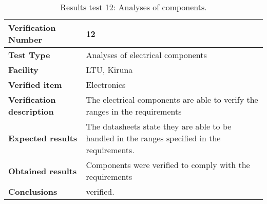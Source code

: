 \begin{table}[H]
\centering

\begin{tabular}{|m{}| m{} |}
\hline
\textbf{Verification Number} 		& 12 					\\ \hline
\textbf{Test Type} 					& Analyses of electrical components		\\ \hline
\textbf{Facility} 					& LTU, Kiruna \\ \hline
\textbf{Verified item} 				& Electronics \\ \hline

\textbf{Verification description} 	& The electrical components are able to verify the ranges in the requirements \\ \hline

\textbf{Expected results} 			& The datasheets state they are able to be handled in the ranges specified in the requirements. \\ \hline

\textbf{Obtained results} 			& Components were verified to comply with the requirements \\ \hline

\textbf{Conclusions} 				& verified.		\\ \hline
\end{tabular}
\caption{Results test 12: Analyses of components.}
\label{tab:testresult12:components}
\end{table}


\raggedbottom
